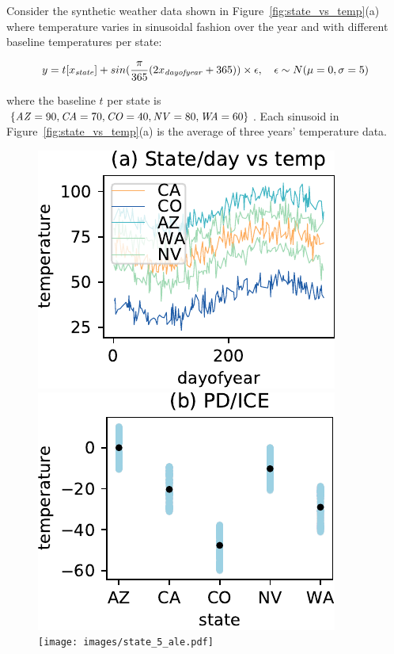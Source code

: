 \documentclass{article}
\newcommand{\figref}[1]{Figure~\ref{#1}}
\begin{document}
Consider the synthetic weather data shown in \figref{fig:state_vs_temp}(a) where temperature varies in sinusoidal fashion over the year and with different baseline temperatures per state:

\begin{equation}\label{eq:weather}
y = t[x_{\it state}] + sin(\frac{\pi}{365}(2x_{\it dayofyear}+365)) \times \epsilon, ~~~ \epsilon \sim N(\mu=0,\sigma=5)
\end{equation}

\noindent where the baseline $t$ per state is $\{{\it AZ}=90, {\it CA}=70, {\it CO}=40, {\it NV}=80, {\it WA}=60\}$. Each sinusoid in \figref{fig:state_vs_temp}(a) is the average of three years' temperature data.

\begin{figure}[htbp]
\begin{center}
\includegraphics[scale=0.45]{images/dayofyear_vs_temp.pdf}~~
\includegraphics[scale=0.45]{images/state_vs_temp_pdp.pdf}~~
\texttt{[image: images/state\_5\_ale.pdf]}~~

\end{center}
\end{figure}
\end{document}

